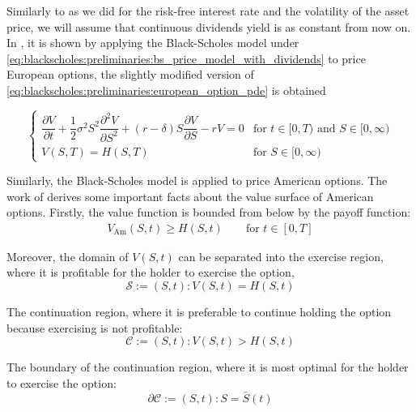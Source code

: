 Similarly to
as we did for the risk-free interest rate and the volatility of the asset price,
we will assume that continuous dividends yield is as constant from now on.
In \cite{wilmott_howison_dewynne_1995}, it is shown by applying the Black-Scholes 
model under \eqref{eq:blackscholes:preliminaries:bs_price_model_with_dividends} 
to price European options, the slightly modified version of \eqref{eq:blackscholes:preliminaries:european_option_pde}
is obtained

\begin{equation}
  \begin{cases}
    \dfrac{\partial{V}}{\partial{t}} + \dfrac{1}{2}\sigma^{2} S^2 \dfrac{\partial^2{V}}{\partial{S^2}} + (r - \delta) S \dfrac{\partial{V}}{\partial{S}} - rV = 0 & \text{for $t\in[0,T)$ and $S\in[0, \infty)$} \\
    V(S, T) = H(S, T) & \text{for $S\in[0, \infty)$}
  \end{cases}
  \label{eq:chapter2:european_option_pde_with_dividens}
\end{equation}
 
Similarly, the Black-Scholes model is applied to price American options.
The work of \cite{wilmott_howison_dewynne_1995} derives some important facts 
about the value surface of American options. Firstly, the value function is 
bounded from below by the payoff function:
\begin{align}
V_{\text{Am}}(S, t) \ge H(S, t) \qquad \text{for $t \in [0, T]$}
\label{eq:blackscholes:american_options_price_lower_bound}
\end{align}

Moreover, the domain of $V(S, t)$ can be separated into the exercise region, 
where it is profitable for the holder to exercise the option,
\begin{equation}
\mathcal{S} := {(S, t) : V(S, t) = H(S, t)}
\label{eq:blackscholes:preliminaries:exercise_region}
\end{equation}

The continuation region, where it is preferable to continue holding the option 
because exercising is not profitable:
\begin{equation}
\mathcal{C} := {(S, t) : V(S, t) > H(S, t)}
\end{equation}

The boundary of the continuation region, where it is most optimal for the 
holder to exercise the option:
\begin{equation}
\partial \mathcal{C} := {(S, t) : S = \bar{S}(t)}
\label{eq:blackscholes:preliminaries:continuation_region}
\end{equation}

